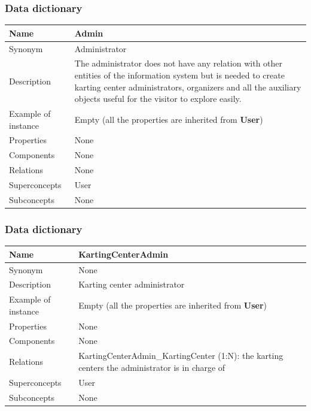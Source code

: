 \documentclass{beamer}
\begin{document}
\begin{frame}
    \frametitle{Data dictionary}
    \begin{table}
    \tiny
    \begin{tabular}{|p{2cm}|p{6cm}|}
    \hline
    Name & \textbf{Admin} \\
    \hline
    Synonym & Administrator \\
    \hline
    Description & The administrator does not have any relation with other 
    entities of the information system but is needed to create karting center administrators,
    organizers and all the auxiliary objects useful for the visitor to explore easily. \\
    \hline
    Example of instance & Empty (all the properties are inherited from \textbf{User}) \\
    \hline
    Properties & None \\
    \hline
    Components & None \\
    \hline
    Relations & None \\
    \hline
    Superconcepts & User \\
    \hline
    Subconcepts & None \\
    \hline
    \end{tabular}
    \end{table}
\end{frame}

\begin{frame}
    \frametitle{Data dictionary}
    \begin{table}
    \tiny
    \begin{tabular}{|p{2cm}|p{6cm}|}
    \hline
    Name & \textbf{KartingCenterAdmin} \\
    \hline
    Synonym & None \\
    \hline
    Description & Karting center administrator \\
    \hline
    Example of instance & Empty (all the properties are inherited from \textbf{User}) \\
    \hline
    Properties & None \\
    \hline
    Components & None \\
    \hline
    Relations &
    KartingCenterAdmin\_KartingCenter (1:N): the karting centers the administrator is in charge of \\
    \hline
    Superconcepts & User \\
    \hline
    Subconcepts & None \\
    \hline
    \end{tabular}
    \end{table}
\end{frame}
\end{document}
